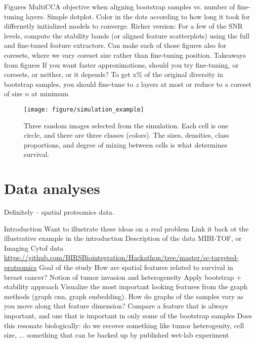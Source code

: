 \documentclass[11pt]{article}
\begin{document}
\begin{outline}
    \2 Figures
      \3 MultiCCA objective when aligning bootstrap samples vs. number of
      fine-tuning layers. Simple dotplot. Color in the dots according to how
      long it took for differnetly initialized models to converge.
      \3 Richer version: For a few of the SNR levels, compute the stability
      bands (or aligned feature scatterplots) using the full and fine-tuned
      feature extractors.
      \3 Can make each of those figures also for coresets, where we vary coreset
      size rather than fine-tuning position.
    \2 Takeaways from figures
      \3 If you want faster approximations, should you try fine-tuning, or
      coresets, or neither, or it depends?
      \3 To get x\% of the original diversity in bootstrap samples, you should
      fine-tune to $z$ layers at most or reduce to a coreset of size $n$ at
      minimum
\end{outline}

\begin{figure}
  \texttt{[image: figure/simulation\_example]}
  \caption{Three random images selected from the simulation. Each cell is one
    circle, and there are three classes (colors). The sizes, densities, class
    proportions, and degree of mixing between cells is what determines
    survival.}
\end{figure}

\section{Data analyses}

Definitely -- spatial proteomics data.

\begin{outline}
  \1 Introduction
    \2 Want to illustrate these ideas on a real problem
      \3 Link it back ot the illustrative example in the introduction
    \2 Description of the data
      \3 MIBI-TOF, or Imaging Cytof data
      \3 \url{https://github.com/BIRSBiointegration/Hackathon/tree/master/sc-targeted-proteomics}
  \1 Goal of the study
    \2 How are spatial features related to survival in breast cancer?
    \2 Notion of tumor invasion and heterogeneity
  \1 Apply bootstrap + stability approach
    \2 Visualize the most important looking features from the graph methods
    (graph cnn, graph embedding). How do graphs of the samples vary as you move
    along that feature dimension?
    \2 Compare a feature that is always important, and one that is important in
    only some of the bootstrap samples
    \2 Does this resonate biologically: do we recover something like tumor
    heterogenity, cell size, ... something that can be backed up by published
    wet-lab experiment
\end{outline}
\end{document}
